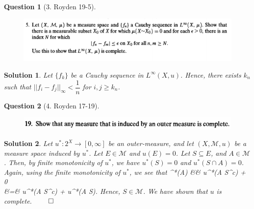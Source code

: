 \documentclass{article} %
\def\eQb#1\eQe{\begin{eqnarray*}#1\end{eqnarray*}}
\theoremstyle{quest}
\newtheorem*{question}{Question}
\newtheorem*{solution}{Solution}
\begin{document}
\newpage

\begin{question}[3. Royden 19-5]
\hfill
\begin{figure}[h!]
  \centering
    \includegraphics[width=1\textwidth]{19-5.png}
\end{figure}
\end{question}
\begin{solution}
Let $\{ f_k \}$ be a Cauchy sequence in $L^{\infty}(X,u)$. Hence, there
exists $k_n$ such that $|| f_i - f_j ||_{\infty} < \dfrac{1}{n}$ for
$i,j \geq k_n$. 
\end{solution}

\newpage

\begin{question}[4. Royden 17-19]
\hfill
\begin{figure}[h!]
  \centering
    \includegraphics[width=1\textwidth]{17-19.png}
\end{figure}
\end{question}
\begin{solution}
Let $u^*:2^X \to [0,\infty]$ be an outer-measure, and let
$(X,\mathscr{M},u)$ be a measure space induced by $u^*$. Let $E \in 
\mathscr{M}$ and $u(E) = 0$. Let $S \subseteq E$, and $A \in \mathscr{M}$.
Then, by finite monotonicity of $u^*$, we have $u^*(S) = 0$ and $u^*(S 
\cap A) = 0$. Again, using the finite 
monotonicity of $u^*$, we see that
\eQb
u^*(A) &\geq& u^*(A \cap S^c) + 0 \\
&=& u^*(A \cap S^c) + u^*(A \cap S).
\eQe 
Hence, $S \in \mathscr{M}$. We have shown that $u$ is complete.
 \hfill $\qed$
\end{solution}

\newpage
\end{document}
